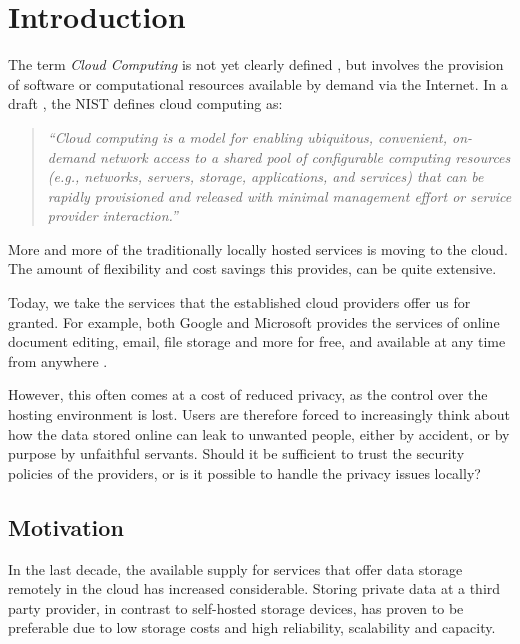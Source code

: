\documentclass[pdftex,english,10pt,b5paper,twoside]{book}
\begin{document}
\chapter{Introduction}
\label{ch:intro}
\setcounter{page}{1}

The term \emph{Cloud Computing} is not yet clearly defined \cite{clouddef}, but
involves the provision of software or computational resources available by
demand via the Internet.  In a draft \cite{cloud_nistdef}, the \ac{NIST}
defines cloud computing as:

\begin{quote}\it ``Cloud computing is a model for enabling ubiquitous,
convenient, on-demand network access to a shared pool of configurable computing
resources (e.g., networks, servers, storage, applications, and services) that
can be rapidly provisioned and released with minimal management effort or
service provider interaction.'' \end{quote}

More and more of the traditionally locally hosted services is moving to the
cloud. The amount of flexibility and cost savings this provides, can be quite
extensive.

Today, we take the services that the established cloud providers offer us for
granted. For example, both Google and Microsoft provides the services of online
document editing, email, file storage and more for free, and available at any
time from anywhere \cite{googleservices, microsoftservices}.

However, this often comes at a cost of reduced privacy, as the control over the
hosting environment is lost. Users are therefore forced to increasingly think
about how the data stored online can leak to unwanted people, either by
accident, or by purpose by unfaithful servants. Should it be sufficient to
trust the security policies of the providers, or is it possible to handle the
privacy issues locally?

\section{Motivation}

In the last decade, the available supply for services that offer data storage
remotely in the cloud has increased considerable. Storing private data at a
third party provider, in contrast to self-hosted storage devices, has proven to
be preferable due to low storage costs and high reliability, scalability and
capacity.
\end{document}

